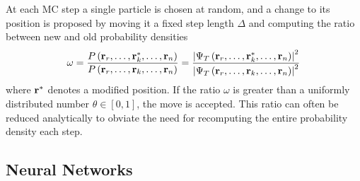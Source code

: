 At each MC step a single particle is chosen at random, and a change to its
position is proposed by moving it a fixed step length \(\Delta\) and computing the
ratio between new and old probability densities
\begin{align*}
\omega = \frac{P\left( \vb{r}_{r}, \ldots, \vb{r}_{k}^{*}, \ldots, \vb{r}_{n} \right)}{P\left( \vb{r}_{r}, \ldots, \vb{r}_{k}, \ldots, \vb{r}_{n} \right)}
=  \frac{\left| \Psi_{T}\left( \vb{r}_{r}, \ldots, \vb{r}_{k}^{*}, \ldots, \vb{r}_{n} \right)\right|^{2}}{\left| \Psi_{T}\left( \vb{r}_{r}, \ldots, \vb{r}_{k}, \ldots, \vb{r}_{n} \right)\right|^{2}}
\end{align*}
where \(\vb{r}^{*}\) denotes a modified position.
If the ratio \(\omega\) is greater
than a
uniformly distributed number \(\theta \in [0, 1]\), the move is accepted.
This ratio can often be reduced analytically to obviate the need for recomputing
the entire probability density each step.



\subsection{Neural Networks}

